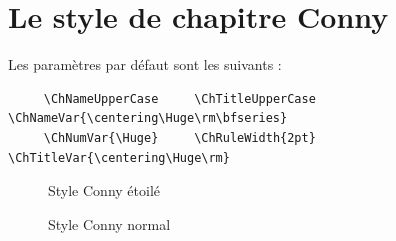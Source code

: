 \documentclass{report}
\begin{document}
    \section{Le style de chapitre Conny}
    Les paramètres par défaut sont les suivants :
    {\small\begin{verbatim}
     \ChNameUpperCase     \ChTitleUpperCase    \ChNameVar{\centering\Huge\rm\bfseries}
     \ChNumVar{\Huge}     \ChRuleWidth{2pt}    \ChTitleVar{\centering\Huge\rm}
    \end{verbatim}}
    \begin{figure}[h]
      \begin{minipage}{7 cm}
        \centerline{\color{gray!25}}
        \caption{Style Conny \og étoilé \fg{}}
      \end{minipage}\hfill
      \begin{minipage}{7 cm}
        \centerline{\color{gray!25}}
        \caption{Style Conny \og normal \fg{}}
      \end{minipage}\hfill
    \end{figure}
\end{document}
